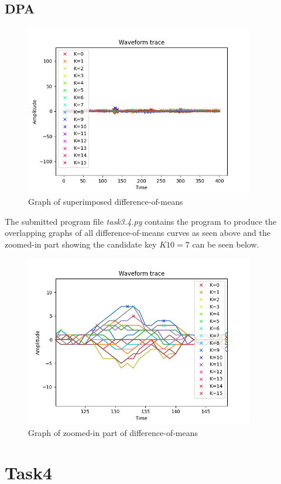 \documentclass[1p,16pt]{elsarticle}
\begin{document}
\subsection{DPA}%
\label{sub:dpa}

\begin{figure}[H]
	\centering
    \centerline{\includegraphics[width=10cm]{peaks_plot}}
    \caption{Graph of superimposed difference-of-means}\label{fig:peaks_plot}
\end{figure}

The submitted program file \textit{task3.4.py} contains the program to produce the overlapping graphs
of all difference-of-means curves as seen above and the zoomed-in part
showing the candidate key $K10=7$ can be seen below.

\begin{figure}[H]
	\centering
    \centerline{\includegraphics[width=10cm]{peak_plot}}
    \caption{Graph of zoomed-in part of difference-of-means}\label{fig:peak_plot}
\end{figure}

\section{Task4}
\end{document}
